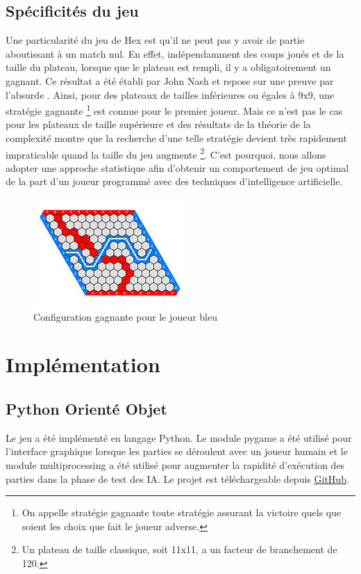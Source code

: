 \documentclass[a4paper]{article}
\theoremstyle{definition}
\begin{document}
\subsection{Spécificités du jeu}

Une particularité du jeu de Hex est qu'il ne peut pas y avoir de partie aboutissant à un match nul. En effet, indépendamment des coups joués et de la taille du plateau, lorsque que le plateau est rempli, il y a obligatoirement un gagnant. Ce résultat a été établi par John Nash et repose sur une preuve par l'absurde \cite{hexwiki}.
Ainsi, pour des plateaux de tailles inférieures ou égales à 9x9, une stratégie gagnante \footnote{On appelle stratégie gagnante toute stratégie assurant la victoire quels que soient les choix que fait le joueur adverse.} est connue pour le premier joueur. Mais ce n'est pas le cas pour les plateaux de taille supérieure et des résultats de la théorie de la complexité montre que la recherche d'une telle stratégie devient très rapidement impraticable quand la taille du jeu augmente \footnote{Un plateau de taille classique, soit 11x11, a un facteur de branchement de 120.}. C'est pourquoi, nous allons adopter une approche statistique afin d'obtenir un comportement de jeu optimal de la part d'un joueur programmé avec des techniques d'intelligence artificielle.

\begin{figure}[h]
	\centering
	\includegraphics[scale=1]{11x11_gagnant.jpg}
	\caption{Configuration gagnante pour le joueur bleu}
\end{figure}

\section{Implémentation}

\subsection{Python Orienté Objet}

Le jeu a été implémenté en langage Python. Le module pygame a été utilisé pour l'interface graphique lorsque les parties se déroulent avec un joueur humain et le module multiprocessing a été utilisé pour augmenter la rapidité d'exécution des parties dans la phase de test des IA. Le projet est téléchargeable depuis \href{https://github.com/Maxime-LP/Hex-Game}{GitHub}.\\
\end{document}

